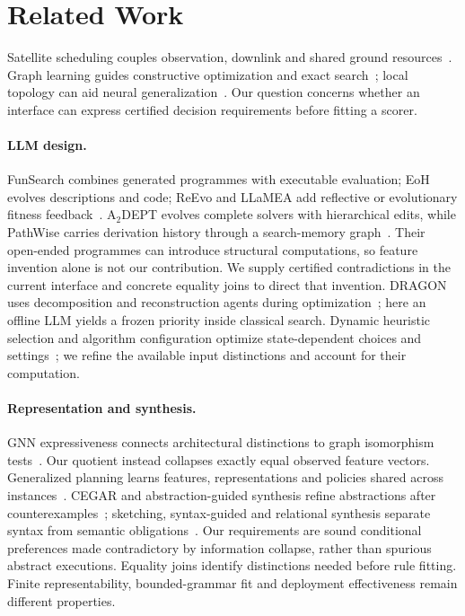 \section{Related Work}
\label{sec:related}
Satellite scheduling couples observation, downlink and shared ground
resources~\cite{augenstein2016optimal,levinson2025optimal,picard2021constellations}.
Graph learning guides constructive optimization and exact
search~\cite{khalil2017learning,li2018gcn,gasse2019exact}; local topology can aid
neural generalization~\cite{bai2025local}. Our question concerns whether an
interface can express certified decision requirements before fitting a scorer.

\paragraph{LLM design.}
FunSearch combines generated programmes with executable evaluation;
EoH evolves descriptions and code; ReEvo and LLaMEA add reflective or evolutionary
fitness feedback~\cite{romeraparedes2024funsearch,liu2024eoh,ye2024reevo,vanstein2025llamea}.
A$_2$DEPT evolves complete solvers with hierarchical edits,
while PathWise carries derivation history through a search-memory
graph~\cite{chen2026a2dept,gungordu2026pathwise}. Their open-ended programmes can
introduce structural computations, so feature invention alone is not our
contribution. We supply certified contradictions in the current interface and
concrete equality joins to direct that invention. DRAGON uses decomposition and
reconstruction agents during optimization~\cite{chen2026dragon}; here an offline
LLM yields a frozen priority inside classical search. Dynamic heuristic selection
and algorithm configuration optimize state-dependent choices and
settings~\cite{speck2021dynamic,hutter2009paramils}; we refine the available
input distinctions and account for their computation.

\paragraph{Representation and synthesis.}
GNN expressiveness connects architectural distinctions to graph isomorphism
tests~\cite{xu2019powerful,morris2019weisfeiler}. Our quotient instead collapses
exactly equal observed feature vectors. Generalized planning learns features,
representations and policies shared across
instances~\cite{bonet2018representation,bonet2019features,frances2021policies}.
CEGAR and abstraction-guided synthesis refine abstractions after
counterexamples~\cite{clarke2000cegar,wang2018abstraction}; sketching,
syntax-guided and relational synthesis separate syntax from semantic
obligations~\cite{solarlezama2006sketch,alur2013sygus,wang2018relational}.
Our requirements are sound conditional preferences made contradictory by
information collapse, rather than spurious abstract executions. Equality joins
identify distinctions needed before rule fitting. Finite representability,
bounded-grammar fit and deployment effectiveness remain different properties.

